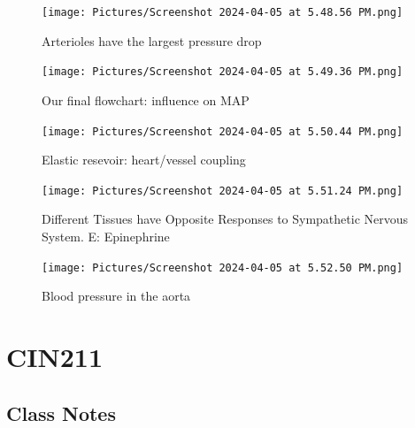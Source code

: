 \documentclass[11pt,fleqn]{book} %
\begin{document}
\begin{figure}[h!]
\begin{center}
    \texttt{[image: Pictures/Screenshot 2024-04-05 at 5.48.56 PM.png]}
\end{center}
    \caption{Arterioles have the largest pressure drop}
\end{figure}

\begin{figure}[h!]
\begin{center}
    \texttt{[image: Pictures/Screenshot 2024-04-05 at 5.49.36 PM.png]}
\end{center}
    \caption{Our final flowchart: influence on MAP}
\end{figure}

\begin{figure}[h!]
\begin{center}
    \texttt{[image: Pictures/Screenshot 2024-04-05 at 5.50.44 PM.png]}
\end{center}
    \caption{Elastic resevoir: heart/vessel coupling}
\end{figure}

\begin{figure}[h!]
\begin{center}
    \texttt{[image: Pictures/Screenshot 2024-04-05 at 5.51.24 PM.png]}
\end{center}
    \caption{Different Tissues have Opposite Responses
to Sympathetic Nervous System. E: Epinephrine}
\end{figure}

\begin{figure}[h!]
\begin{center}
    \texttt{[image: Pictures/Screenshot 2024-04-05 at 5.52.50 PM.png]}
\end{center}
    \caption{Blood pressure in the aorta}
\end{figure}







\part{CIN211}
\chapter{Class Notes}
\end{document}
